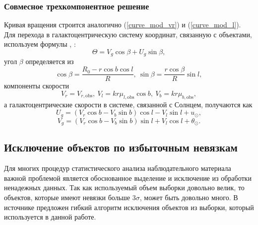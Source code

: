 \documentclass{matmex-diploma-custom}
\begin{document}
\subsubsection{Совмесное трехкомпонентное решение} \label{united_mod_section}
Кривая вращения строится аналогично (\ref{curve_mod_vr}) и (\ref{curve_mod_l}). Для перехода в галактоцентрическую систему координат, связанную с объектами, используем формулы \cite{Reid}, \cite{Gromov}:
\begin{equation}
        \Theta = V_g \cos{\beta} + U_g \sin{\beta},
\end{equation}
угол $\beta$ определяется из
\begin{equation}
        \cos{\beta} = \frac{R_0 - r \cos{b} \cos{l}}{R}, ~\sin{\beta} = \frac{r \cos{\beta}}{R} \sin{l},
\end{equation}
компоненты скорости
\begin{equation}
        V_r = V_{r, \mathrm{obs}}, ~V_l = k r \mu_{l, \mathrm{obs}} \cos{b}, ~V_b = k r \mu_{b, \mathrm{obs}},
\end{equation}
а галактоцентрические скорости в системе, связанной с Солнцем, получаются как
\begin{equation}
        U_g = (V_r \cos{b} - V_b \sin{b}) \cos{l} - V_l \sin{l} + u_{\odot},
\end{equation}
\begin{equation}
        V_g = (V_r \cos{b} - V_b \sin{b}) \sin{l} + V_l \cos{l} + \theta_{\odot}.
\end{equation}


\subsection{Исключение объектов по избыточным невязкам} \label{err_filter}
Для многих процедур статистического анализа наблюдательного материала важной проблемой является обоснованное выделение и исключение из обработки ненадежных данных. Так как используемый объем выборки довольно велик, то объектов, которые имеют невязки больше $3\sigma$, может быть довольно много. В источнике \cite{NIIE} предложен гибкий алгоритм исключения объектов из выборки, который используется в данной работе.
\end{document}
